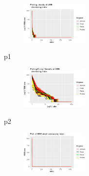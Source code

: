 \documentclass[
  letterpaper,
  DIV=11,
  numbers=noendperiod]{scrreprt}
\newenvironment{Shaded}{\begin{snugshade}}{\end{snugshade}}
\newcommand{\NormalTok}[1]{\textcolor[rgb]{0.00,0.23,0.31}{#1}}
\begin{document}
\begin{figure}[H]

{\centering \includegraphics[width=0.3\textwidth,height=\textheight]{index_files/figure-pdf/unnamed-chunk-52-1.pdf}

}

\end{figure}

\begin{Shaded}
\begin{Highlighting}[]
\NormalTok{p1}
\end{Highlighting}
\end{Shaded}

\begin{figure}[H]

{\centering \includegraphics[width=0.3\textwidth,height=\textheight]{index_files/figure-pdf/unnamed-chunk-52-2.pdf}

}

\end{figure}

\begin{Shaded}
\begin{Highlighting}[]
\NormalTok{p2}
\end{Highlighting}
\end{Shaded}

\begin{figure}[H]

{\centering \includegraphics[width=0.3\textwidth,height=\textheight]{index_files/figure-pdf/unnamed-chunk-52-3.pdf}

}

\end{figure}
\end{document}
